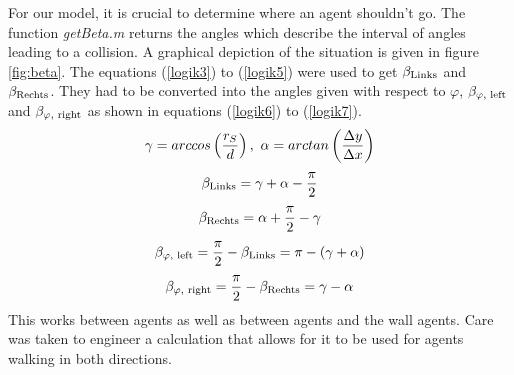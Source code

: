 \noi For our model, it is crucial to determine where an agent shouldn't go. The function \textit{getBeta.m} returns the angles which describe the interval of angles leading to a collision. A graphical depiction of the situation is given in figure \ref{fig:beta}. The equations (\ref{logik3}) to (\ref{logik5}) were used to get $\beta_{\text{Links}}$ and $\beta_{\text{Rechts}}$. They had to be converted into the angles given with respect to $\varphi$, $\beta_{\varphi,\text{ left}}$ and $\beta_{\varphi,\text{ right}}$ as shown in equations (\ref{logik6}) to (\ref{logik7}).
\begin{equation}\label{logik3}
	\gamma = arccos\displaystyle \left(\frac{r_S}{d}\right),\ \alpha = arctan\displaystyle \left(\frac{\Delta y}{\Delta x}\right)
\end{equation}
\begin{equation}\label{logik4}
	\beta_{\text{Links}} = \gamma + \alpha - \frac{\pi}{2}
\end{equation}
\begin{equation}\label{logik5}
	\beta_{\text{Rechts}} = \alpha + \frac{\pi}{2} - \gamma
\end{equation}
\begin{equation}\label{logik6}
  \beta_{\varphi,\text{ left}} = \frac{\pi}{2} - \beta_{\text{Links}} = \pi - (\gamma + \alpha)
\end{equation}
\begin{equation}\label{logik7}
  \beta_{\varphi,\text{ right}} = \frac{\pi}{2} - \beta_{\text{Rechts}} = \gamma - \alpha
\end{equation}
\noi This works between agents as well as between agents and the wall agents. Care was taken to engineer a calculation that allows for it to be used for agents walking in both directions.

